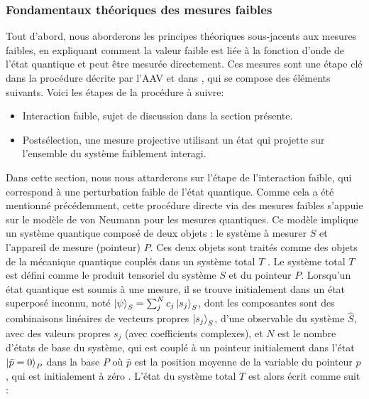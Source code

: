 \subsubsection{Fondamentaux théoriques des mesures faibles}

\begin{onehalfspace}
    Tout d’abord, nous aborderons les principes théoriques sous-jacents 
    aux mesures faibles, en expliquant comment la valeur faible est liée à la 
    fonction d’onde de l’état quantique et peut être mesurée directement. 
    Ces mesures sont une étape clé dans la procédure décrite par l’AAV 
    \cite{Aharonov} et dans \cite{Lundeen_Resch}, qui se compose des 
    éléments suivants. Voici les étapes de la procédure à suivre:

    \begin{itemize}
        \item Interaction faible, sujet de discussion dans la section présente.
        \item Postsélection, une mesure projective utilisant un état qui projette sur l'ensemble du système faiblement interagi.
    \end{itemize}

    \noindent Dans cette section, nous nous attarderons sur l’étape de 
    l’interaction faible, qui correspond à une perturbation faible de 
    l’état quantique. Comme cela a été mentionné précédemment, cette 
    procédure directe via des mesures faibles s’appuie sur le modèle de 
    von Neumann pour les mesures quantiques. Ce modèle implique un 
    système quantique composé de deux objets : le système à mesurer $S$ 
    et l’appareil de mesure (pointeur) $P$. Ces deux objets sont traités 
    comme des objets de la mécanique quantique couplés dans un système 
    total $T$ \cite{vonNeumann}. Le système total $T$ est 
    défini comme le produit tensoriel du système $S$ et du pointeur $P$. 
    Lorsqu'un état quantique est 
    soumis à une mesure, il se trouve initialement dans un état superposé 
    inconnu, noté $\ket{\psi}_S = \sum_{j}^{N}c_{j}\ket{s_j}_S$, dont les 
    composantes sont des combinaisons linéaires de vecteurs propres 
    $\ket{s_j}_S$, d'une observable du système $\hat{S}$, avec des valeurs 
    propres $s_j$ (avec coefficients complexes), et $N$ est le nombre 
    d'états de base du système, qui est couplé à un pointeur 
    initialement dans l’état $\ket{\bar{p} = 0}_P$ dans la base $P$ 
    où $\bar{p}$ est la position moyenne de la variable du pointeur 
    $p$, qui est initialement à zéro \cite{Hairiri,vonNeumann}. 
    L’état du système total $T$ est alors écrit comme suit :


\end{onehalfspace}
